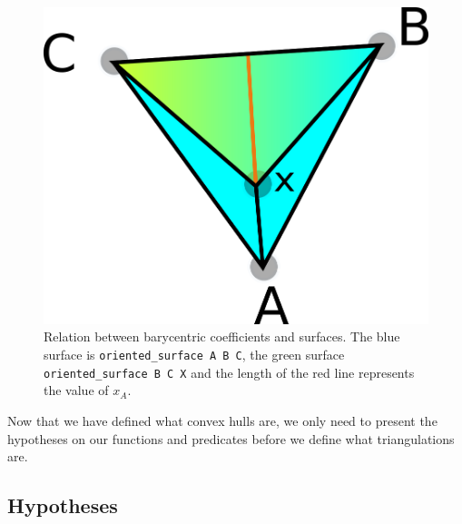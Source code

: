 \documentclass[a4paper,10pt]{article}
\begin{document}
\begin{figure}
  \centering
  \includegraphics[scale=2]{cara.png}

  \caption{\label{cara} Relation between barycentric coefficients and surfaces.
    The blue surface is {\tt oriented\_surface A B C}, the green surface {\tt oriented\_surface B C X} and the length of the red line represents the value of $x_A$.}
\end{figure}

Now that we have defined what convex hulls are, we only need to present the hypotheses on our functions and predicates before we define what triangulations are.
  \subsection{Hypotheses}
  \label{Hypothesis}
\end{document}
